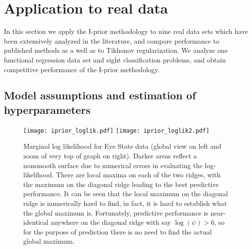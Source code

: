 \documentclass[preprint,12pt,authoryear]{elsarticle}
\begin{document}













\section{Application to real data}\label{sec-applic}

In this section we apply the I-prior methodology to nine real data sets which have been extensively analyzed in the literature, and compare performance to published methods as a well as to Tikhonov regularization. We analyze one functional regression data set and eight classification problems, and obtain competitive performance of the I-prior methodology. 


\subsection{Model assumptions and estimation of hyperparameters}\label{sec-estdetails}

\begin{figure}[tbp]
	\centering
	\texttt{[image: iprior\_loglik.pdf]}\hspace*{5mm}
	\texttt{[image: iprior\_loglik2.pdf]}%
	\caption{Marginal log likelihood for Eye State data (global view on left and zoom of very top of graph on right). Darker areas reflect a nonsmooth surface due to numerical errors in evaluating the log-likelihood. There are local maxima on each of the two ridges, with the maximum on the diagonal ridge leading to the best predictive performance. It can be seen that the local maximum on the diagonal ridge is numerically hard to find, in fact, it is hard to establish what the global maximum is. Fortunately, predictive performance is near-identical anywhere on the diagonal ridge with say $\log(\psi)>6$, so for the purpose of prediction there is no need to find the actual global maximum.}
	\label{fig-marglik}
\end{figure}
\end{document}

